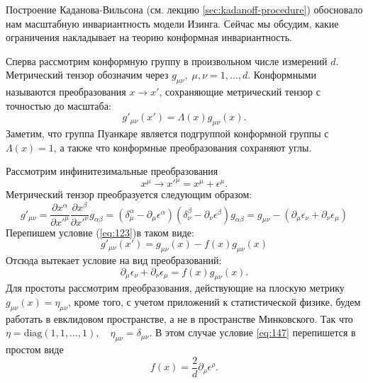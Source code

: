 \documentclass[a4paper,12pt]{article}
\theoremstyle{definition}
\theoremstyle{definition}
\theoremstyle{definition}
\begin{document}
Построение Каданова-Вильсона (см. лекцию \ref{sec:kadanoff-procedure}) обосновало нам масштабную
инвариантность модели Изинга. Сейчас мы обсудим, какие ограничения накладывает на теорию конформная
инвариантность.  

Сперва рассмотрим конформную группу в произвольном числе измерений $d$. Метрический тензор обозначим
через $g_{\mu\nu},\; \mu,\nu=1,\dots,d$. Конформными называются преобразования $x\to x'$,
сохраняющие метрический тензор с точностью до масштаба: 
\begin{equation}
  \label{eq:123}
  g'_{\mu\nu}(x')=\Lambda(x) g_{\mu\nu}(x).
\end{equation}
Заметим, что группа Пуанкаре является подгруппой конформной группы с $\Lambda(x)=1$, а также что
конформные преобразования сохраняют углы.  

Рассмотрим инфинитезимальные преобразования
\begin{equation}
  \label{eq:144}
  x^{\mu}\to x'^{\mu}=x^{\mu}+\epsilon^{\mu}.
\end{equation}
Метрический тензор преобразуется следующим образом:
\begin{equation}
  \label{eq:145}
  g'_{\mu\nu}=\frac{\partial x^{\alpha}}{\partial x'^{\mu}}\frac{\partial x^{\beta}}{\partial
    x'^{\nu}}
  g_{\alpha\beta}=(\delta^{\alpha}_{\mu}-\partial_{\mu}\epsilon^{\alpha})(\delta^{\beta}_{\nu}-\partial_{\nu}
  \epsilon^{\beta})g_{\alpha\beta}=g_{\mu\nu}-(\partial_{\mu}\epsilon_{\nu}+\partial_{\nu}\epsilon_{\mu}) 
\end{equation}
Перепишем условие (\ref{eq:123})в таком виде:
\begin{equation}
  \label{eq:146}
  g'_{\mu\nu}(x')=g_{\mu\nu}(x)-f(x)g_{\mu\nu}(x)
\end{equation}
Отсюда вытекает условие на вид преобразований:
\begin{equation}
  \label{eq:147}
  \partial_{\mu}\epsilon_{\nu}+\partial_{\nu}\epsilon_{\mu}=f(x)g_{\mu\nu}(x).
\end{equation}
Для простоты рассмотрим преобразования, действующие на плоскую метрику
$g_{\mu\nu}(x)=\eta_{\mu\nu}$, кроме того, с учетом приложений к статистической физике, будем
работать в евклидовом пространстве, а не в пространстве Минковского. Так что
$\eta=\mathrm{diag}(1,1,\dots,1),\quad \eta_{\mu\nu}=\delta_{\mu\nu}$. В этом случае условие
\eqref{eq:147} перепишется в простом виде 
\begin{equation}
  \label{eq:148}
  f(x)=\frac{2}{d}\partial_{\rho}\epsilon^{\rho}.
\end{equation}
\end{document}
